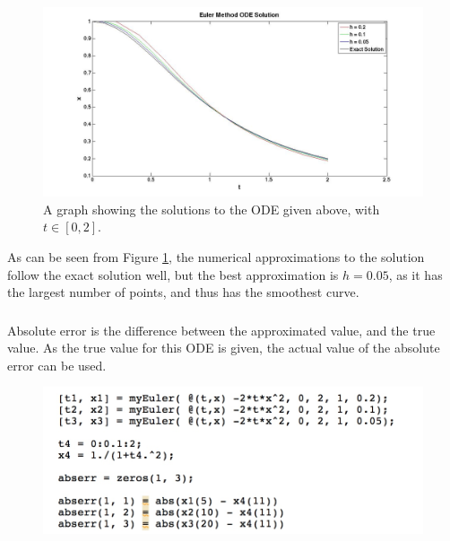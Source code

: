 \documentclass[a4paper]{article}
\begin{document}
\begin{figure}[H]
\centering
\includegraphics[width=1\textwidth]{eulerodesolution.jpg}
\caption{\label{fig:eulerodesolution}A graph showing the solutions to the ODE given above, with $t \in [0,2]$. }

\end{figure}


As can be seen from Figure \ref{fig:eulerodesolution}, the numerical approximations to the solution follow the exact solution well, but the best approximation is $h = 0.05$, as it has the largest number of points, and thus has the smoothest curve. 

\subsubsection{}


Absolute error is the difference between the approximated value, and the true value. As the true value for this ODE is given, the actual value of the absolute error can be used. 

\begin{figure}[H]
\includegraphics[width=1\textwidth]{question1error.jpg}
\end{figure}
\end{document}
